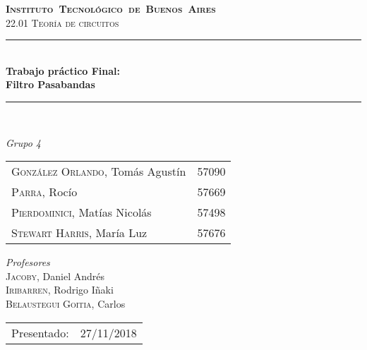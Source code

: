 \begin{titlepage}
\newcommand{\HRule}{\rule{\linewidth}{0.5mm}}
\center
\mbox{\textsc{\LARGE \bfseries {Instituto Tecnol\'ogico de Buenos Aires}}}\\[1.5cm]
\textsc{\Large 22.01 Teor\'ia de circuitos}\\[0.5cm]


\HRule \\[0.6cm]
{ \Huge \bfseries Trabajo pr\'actico Final: \\ Filtro Pasabandas}\\[0.4cm] %
\HRule \\[1.5cm]


{\large

\emph{Grupo 4}\\
\vspace{3px}

\begin{tabular}{lr} 	
\textsc{Gonz\'alez Orlando}, Tom\'as Agust\'in  & 57090 \\
\textsc{Parra}, Roc\'io  & 57669 \\ 	
\textsc{Pierdominici}, Mat\'ias Nicol\'as & 57498 \\
\textsc{Stewart Harris}, Mar\'ia Luz  & 57676 \\ 	     
\end{tabular}

\vspace{20px}

\emph{Profesores}\\
\vspace{3px}
\textsc{Jacoby,} Daniel Andr\'es\\ 	
\textsc{Iribarren,} Rodrigo I\~naki\\
\textsc{Belaustegui Goitia,} Carlos \\

\vspace{100px}

\begin{tabular}{ll}

Presentado: & 27/11/2018\\

\end{tabular}

}

\vfill

\end{titlepage}